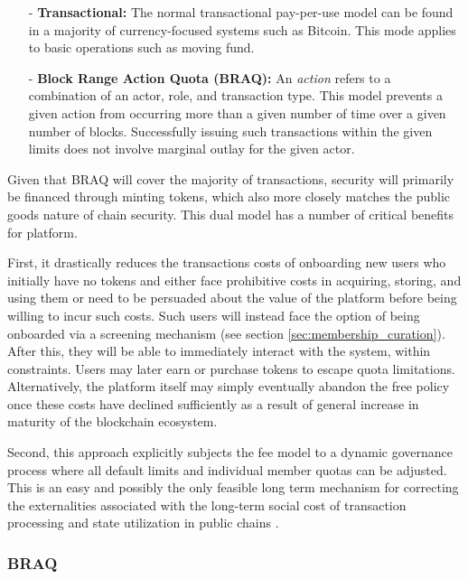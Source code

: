 \documentclass{article}
\begin{document}
\begin{itemize}

    \item[-] \textbf{Transactional:}  The normal transactional pay-per-use model can be found in a majority of currency-focused systems such as Bitcoin. This mode applies to basic operations such as moving fund.

    \item[-] \textbf{Block Range Action Quota (BRAQ):} An \textit{action} refers to a combination of an actor, role, and transaction type. This model prevents a given action from occurring more than a given number of time over a given number of blocks. Successfully issuing such transactions within the given limits does not involve marginal outlay for the given actor.

\end{itemize}

Given that BRAQ will cover the majority of transactions, security will primarily be financed through minting tokens, which also more closely matches the public goods nature of chain security. This dual model has a number of critical benefits for platform.

First, it drastically reduces the transactions costs of onboarding new users who initially have no tokens and either face prohibitive costs in acquiring, storing, and using them or need to be persuaded about the value of the platform before being willing to incur such costs. Such users will instead face the option of being onboarded via a screening mechanism (see section \ref{sec:membership_curation}). After this, they will be able to immediately interact with the system, within constraints. Users may later earn or purchase tokens to escape quota limitations. Alternatively, the platform itself may simply eventually abandon the free policy once these costs have declined sufficiently as a result of general increase in maturity of the blockchain ecosystem.

Second, this approach explicitly subjects the fee model to a dynamic governance process where all default limits and individual member quotas can be adjusted. This is an easy and possibly the only feasible long term mechanism for correcting the externalities associated with the long-term social cost of transaction processing and state utilization in public chains \cite{blockchain_resource_pricing}.

\subsubsection{BRAQ} \label{sec:BRAQ}
\end{document}
